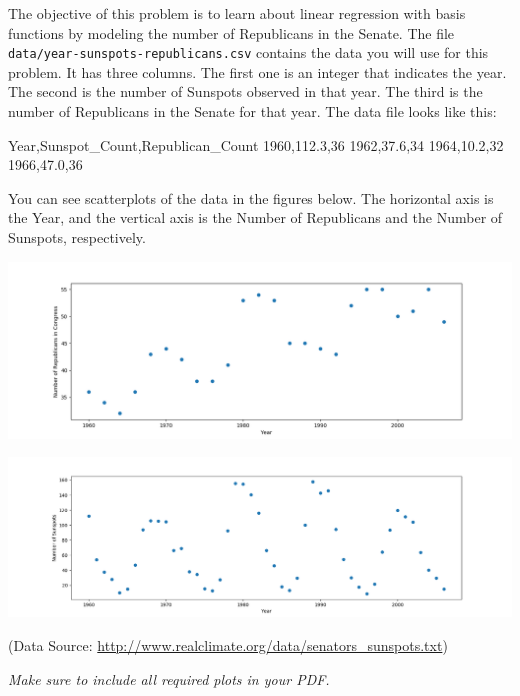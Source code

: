 \documentclass[submit]{harvardml}
\begin{document}

\begin{problem}
  
 The objective of this problem is to learn about linear regression
 with basis functions by modeling the number of Republicans in the
 Senate. The file \verb|data/year-sunspots-republicans.csv| contains the
 data you will use for this problem.  It has three columns.  The first
 one is an integer that indicates the year.  The second is the number
 of Sunspots observed in that year.  The third is the number of Republicans in the Senate for that year.
 The data file looks like this:
 \begin{csv}
Year,Sunspot_Count,Republican_Count
1960,112.3,36
1962,37.6,34
1964,10.2,32
1966,47.0,36
\end{csv}

You can see scatterplots of the data in the figures below.  The horizontal axis is the Year, and the vertical axis is the Number of Republicans and the Number of Sunspots, respectively.

\begin{center}
\includegraphics[width=.5\textwidth]{data/year-republicans}
\end{center}

\begin{center}
\includegraphics[width=.5\textwidth]{data/year-sunspots}
\end{center}

(Data Source: \url{http://www.realclimate.org/data/senators_sunspots.txt})\\
\vspace{-5mm}


\vspace{0.5cm}
\noindent\emph{Make sure to include all required plots in your PDF.}

\begin{enumerate}


\end{enumerate}
\end{problem}
\end{document}
